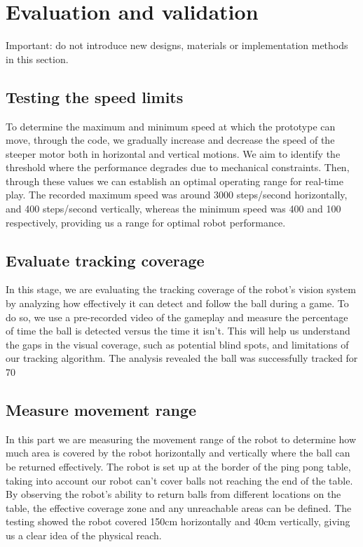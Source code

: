 \chapter{Evaluation and validation}

Important: do not introduce new designs, materials or implementation methods in this section.
\section{Testing the speed limits}
To determine the maximum and minimum speed at which the prototype can move, through the code, we gradually increase and decrease the speed of the steeper motor both in horizontal and vertical motions. 
We aim to identify the threshold where the performance degrades due to mechanical constraints. 
Then, through these values we can establish an optimal operating range for real-time play. 
The recorded maximum speed was around 3000 steps/second horizontally, and 400 steps/second vertically, whereas the minimum speed was 400 and 100 respectively, providing us a range for optimal robot performance.

\section{Evaluate tracking coverage}
In this stage, we are evaluating the tracking coverage of the robot's vision system by analyzing how effectively it can detect and follow the ball during a game. 
To do so, we use a pre-recorded video of the gameplay and measure the percentage of time the ball is detected versus the time it isn't. 
This will help us understand the gaps in the visual coverage, such as potential blind spots, and limitations of our tracking algorithm. 
The analysis revealed the ball was successfully tracked for 70%

\section{Measure movement range}
In this part we are measuring the movement range of the robot to determine how much area is covered by the robot horizontally and vertically where the ball can be returned effectively. 
The robot is set up at the border of the ping pong table, taking into account our robot can't cover balls not reaching the end of the table. 
By observing the robot's ability to return balls from different locations on the table, the effective coverage zone and any unreachable areas can be defined. 
The testing showed the robot covered 150cm horizontally and 40cm vertically, giving us a clear idea of the physical reach.

